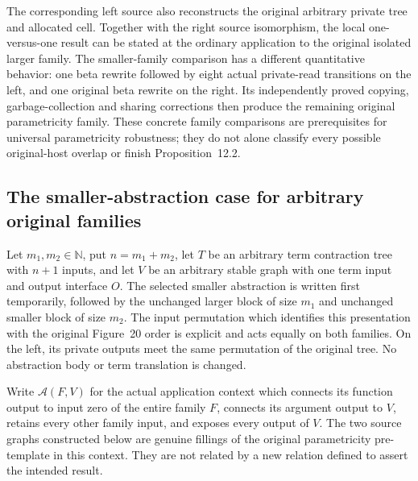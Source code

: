 \par{}
\par{}
%

The corresponding left source also reconstructs the original arbitrary
private tree and allocated cell. Together with the right source
isomorphism, the local one-versus-one result can be stated at the ordinary
application to the original isolated larger family. The smaller-family
comparison has a different quantitative behavior: one beta rewrite followed
by eight actual private-read transitions on the left, and one original beta
rewrite on the right. Its independently proved copying, garbage-collection
and sharing corrections then produce the remaining original parametricity
family. These concrete family comparisons are prerequisites for universal
parametricity robustness; they do not alone classify every possible
original-host overlap or finish Proposition~12.2.

\subsection{The smaller-abstraction case for arbitrary original families}
Let $m_1,m_2\in\mathbb N$, put $n=m_1+m_2$, let $T$ be an arbitrary term contraction tree with $n+1$ inputs, and let $V$ be an arbitrary stable graph with one term input and output interface $O$.  The selected smaller abstraction is written first temporarily, followed by the unchanged larger block of size $m_1$ and unchanged smaller block of size $m_2$.  The input permutation which identifies this presentation with the original Figure~20 order is explicit and acts equally on both families.  On the left, its private outputs meet the same permutation of the original tree.  No abstraction body or term translation is changed.

Write $\mathcal A(F,V)$ for the actual application context which connects its function output to input zero of the entire family $F$, connects its argument output to $V$, retains every other family input, and exposes every output of $V$.  The two source graphs constructed below are genuine fillings of the original parametricity pre-template in this context.  They are not related by a new relation defined to assert the intended result.

